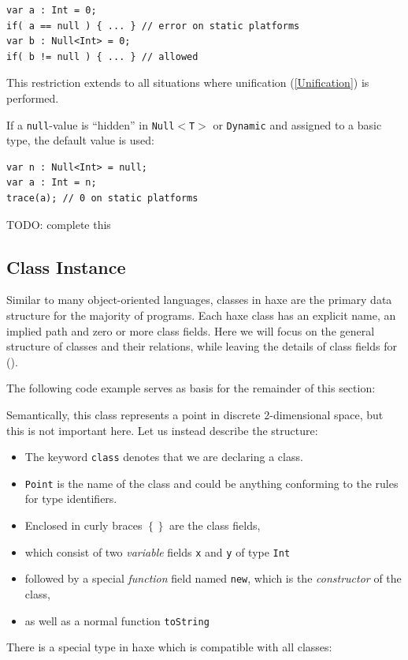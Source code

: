 \documentclass{article}
\newcommand{\type}[1]{\texttt{#1}}
\newcommand{\expr}[1]{\texttt{#1}}
\newcommand{\Fullref}[1]{\nameref{#1} (\Cref{#1})}
\newcommand{\tref}[2]{#1 (\ref{#2})}
\newcommand{\todo}[1]{TODO: #1}
\begin{document}
\begin{lstlisting}
var a : Int = 0;
if( a == null ) { ... } // error on static platforms
var b : Null<Int> = 0;
if( b != null ) { ... } // allowed
\end{lstlisting}
This restriction extends to all situations where \tref{unification}{Unification} is performed.

If a \expr{null}-value is ``hidden'' in \type{Null$<$T$>$} or \type{Dynamic} and assigned to a basic type, the default value is used:

\begin{lstlisting}
var n : Null<Int> = null;
var a : Int = n;
trace(a); // 0 on static platforms
\end{lstlisting}

\todo{complete this}


\subsection{Class Instance}
\label{Class Instance}

Similar to many object-oriented languages, classes in haxe are the primary data structure for the majority of programs. Each haxe class has an explicit name, an implied path and zero or more class fields. Here we will focus on the general structure of classes and their relations, while leaving the details of class fields for \Fullref{Class Fields}.

The following code example serves as basis for the remainder of this section:


Semantically, this class represents a point in discrete 2-dimensional space, but this is not important here. Let us instead describe the structure:

\begin{itemize}
	\item The keyword \expr{class} denotes that we are declaring a class.
	\item \type{Point} is the name of the class and could be anything conforming to the rules for type identifiers.
	\item Enclosed in curly braces \expr{$\left\{\right\}$} are the class fields,
	\item which consist of two \emph{variable} fields \expr{x} and \expr{y} of type \type{Int}
	\item followed by a special \emph{function} field named \expr{new}, which is the \emph{constructor} of the class,
	\item as well as a normal function \expr{toString}
\end{itemize}
There is a special type in haxe which is compatible with all classes:
\end{document}
